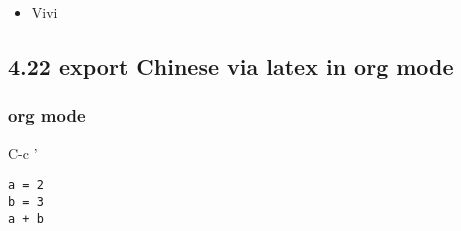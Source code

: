 \documentclass[11pt]{article}
\begin{document}
\begin{itemize}
\item Vivi
\label{sec:orgheadline218}
\end{itemize}

\subsection*{4.22 export Chinese via latex in org mode}
\label{sec:orgheadline222}

\subsubsection*{org mode}
\label{sec:orgheadline221}
C-c '
\begin{verbatim}
a = 2
b = 3
a + b
\end{verbatim}
\end{document}
